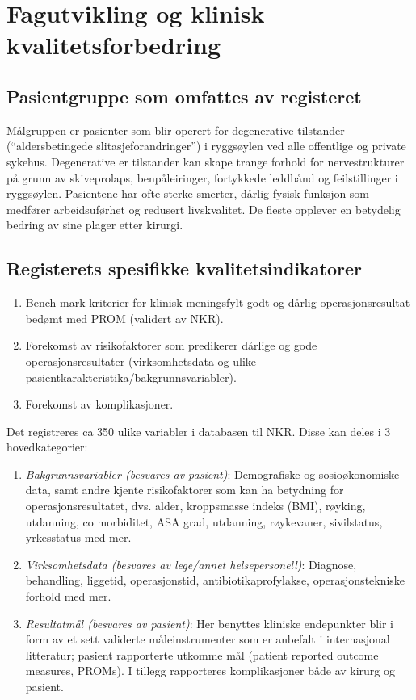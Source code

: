 \documentclass[norsk, a4paper, twocolumn]{report}
\begin{document}
\chapter{Fagutvikling og klinisk kvalitetsforbedring}\label{cha:fag}


\section{Pasientgruppe som omfattes av registeret}
Målgruppen er pasienter som blir operert for degenerative tilstander (``aldersbetingede slitasjeforandringer'') i ryggsøylen ved alle offentlige og private sykehus. Degenerative er tilstander kan skape trange forhold for nervestrukturer på grunn av skiveprolaps, benpåleiringer, fortykkede leddbånd og feilstillinger i ryggsøylen. 
Pasientene har ofte sterke smerter, dårlig fysisk funksjon som medfører arbeidsuførhet og redusert livskvalitet. De fleste opplever en betydelig bedring av sine plager etter kirurgi.


\section{Registerets spesifikke kvalitetsindikatorer}\label{sec:regspe}

\begin{enumerate}
	\item Bench-mark kriterier for klinisk meningsfylt godt og dårlig
    operasjonsresultat bedømt med PROM (validert av NKR).
	\item Forekomst av risikofaktorer som predikerer dårlige og gode
    operasjonsresultater (virksomhetsdata og ulike
    pasientkarakteristika/bakgrunnsvariabler).
	\item Forekomst av komplikasjoner.
\end{enumerate}

Det registreres ca 350 ulike variabler i databasen til NKR. Disse kan deles i 3 hovedkategorier:

\begin{enumerate}
	\item \emph{Bakgrunnsvariabler (besvares av pasient)}: Demografiske og
    sosioøkonomiske data, samt andre kjente risikofaktorer som kan ha betydning
    for operasjonsresultatet, dvs. alder, kroppsmasse indeks (BMI), røyking,
    utdanning, co morbiditet, ASA grad, utdanning, røykevaner, sivilstatus,
    yrkesstatus med mer.  
	\item \emph{Virksomhetsdata (besvares av lege/annet helsepersonell)}: Diagnose,
    behandling, liggetid, operasjonstid, antibiotikaprofylakse, operasjonstekniske
    forhold med mer.
	\item \emph{Resultatmål (besvares av pasient)}: Her benyttes kliniske endepunkter blir i form av et sett validerte måleinstrumenter som er anbefalt
    i internasjonal litteratur; pasient rapporterte utkomme mål (patient
    reported outcome measures, PROMs). I tillegg rapporteres komplikasjoner både av kirurg og pasient.
\end{enumerate}
\end{document}
